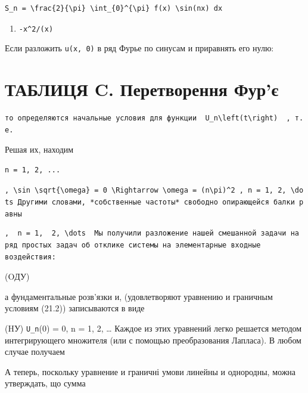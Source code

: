 \documentclass[
  ukrainian,
]{article}
\providecommand{\tightlist}{%
  \setlength{\itemsep}{0pt}\setlength{\parskip}{0pt}}
\begin{document}
\begin{verbatim}
S_n = \frac{2}{\pi} \int_{0}^{\pi} f(x) \sin(nx) dx
\end{verbatim}

\begin{enumerate}
\def\labelenumi{\arabic{enumi}.}
\setcounter{enumi}{9}
\tightlist
\item
  \texttt{-x\^{}2/(x)}
\end{enumerate}

Если разложить \texttt{u(x,\ 0)} в ряд Фурье по синусам и приравнять его
нулю:

\section{ТАБЛИЦЯ C. Перетворення
Фур'є}\label{ux442ux430ux431ux43bux438ux446ux44f-c.-ux43fux435ux440ux435ux442ux432ux43eux440ux435ux43dux43dux44f-ux444ux443ux440ux454}

\begin{verbatim}
то определяются начальные условия для функции  U_n\left(t\right)  , т. е.
\end{verbatim}

Решая их, находим

\begin{verbatim}
n = 1, 2, ...
\end{verbatim}

\texttt{,\ \textquotesingle{}\textbackslash{}sin\ \textbackslash{}sqrt\{\textbackslash{}omega\}\ =\ 0\ \textbackslash{}Rightarrow\ \textbackslash{}omega\ =\ (n\textbackslash{}pi)\^{}2\textquotesingle{}\ ,\ \textquotesingle{}n\ =\ 1,\ 2,\ \textbackslash{}dots\textquotesingle{}\ Другими\ словами,\ *собственные\ частоты*\ свободно\ опирающейся\ балки\ равны}

\begin{verbatim}
,  n = 1,  2, \dots  Мы получили разложение нашей смешанной задачи на ряд простых задач об отклике системы на элементарные входные воздействия:
\end{verbatim}

(OДУ)

а фундаментальные розв'язки и, (удовлетворяют уравнению и граничным
условиям (21.2)) записываются в виде

(HУ) \texttt{U\_n}(0) = 0, n = 1, 2, \ldots{} Каждое из этих уравнений
легко решается методом интегрирующего множителя (или с помощью
преобразования Лапласа). В любом случае получаем

А теперь, поскольку уравнение и граничні умови линейны и однородны,
можна утверждать, що сумма
\end{document}
